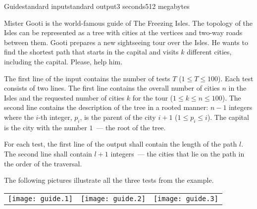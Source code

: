 \begin{problem}{Guide}{standard input}{standard output}{3 seconds}{512 megabytes}

Mister Gooti is the world-famous guide of The Freezing Isles. The topology of the Isles can be represented as a tree with cities at the vertices and two-way roads between them. 
Gooti prepares a new sightseeing tour over the Isles. He wants to find the shortest path that starts in the capital and visits $k$ different cities, including the capital. Please, help him.

\InputFile
The first line of the input contains the number of tests $T$ ($1 \leq T \leq 100$). Each test consists of two lines. The first line contains the overall number of cities $n$ in the Isles and the requested number of cities $k$ for the tour ($1 \leq k \leq n \leq 100$). The second line contains the description of the tree in a rooted manner: $n - 1$ integers where the $i$-th integer, $p_i$, is the parent of the city $i + 1$ ($1 \leq p_i \leq i$). The capital is the city with the number $1$~--- the root of the tree.

\OutputFile
For each test, the first line of the output shall contain the length of the path $l$. The second line shall contain $l + 1$ integers~--- the cities that lie on the path in the order of the traversal.

\Example

\begin{example}
%
\end{example}

\Note
The following pictures illustrate all the three tests from the example.

\begin{center}
\begin{tabular}{c@{\hskip 2cm}c@{\hskip 2cm}c}
\texttt{[image: guide.1]} &
\texttt{[image: guide.2]} &
\texttt{[image: guide.3]}
\end{tabular}
\end{center}


\end{problem}

